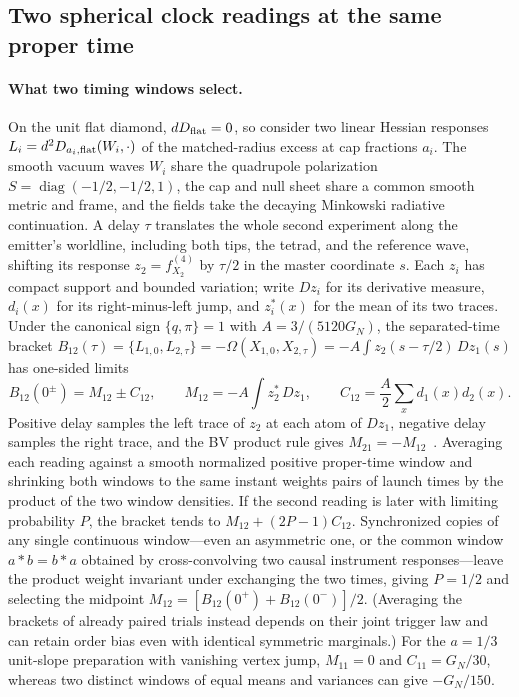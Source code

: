 \documentclass[10pt,a4paper]{article}
\numberwithin{equation}{section}
\begin{document}
\subsection{Two spherical clock readings at the same proper time}
\label{sec:timing}
\paragraph{What two timing windows select.}
On the unit flat diamond, $dD_{\rm flat}=0$, so consider two linear Hessian responses $L_i=d^2D_{a_i,\rm flat}(W_i,\cdot)$ of the matched-radius excess at cap fractions $a_i$. The smooth vacuum waves $W_i$ share the quadrupole polarization $S=\operatorname{diag}(-1/2,-1/2,1)$, the cap and null sheet share a common smooth metric and frame, and the fields take the decaying Minkowski radiative continuation. A delay $\tau$ translates the whole second experiment along the emitter's worldline, including both tips, the tetrad, and the reference wave, shifting its response $z_2=f_{X_2}^{(4)}$ by $\tau/2$ in the master coordinate $s$. Each $z_i$ has compact support and bounded variation; write $Dz_i$ for its derivative measure, $d_i(x)$ for its right-minus-left jump, and $z_i^*(x)$ for the mean of its two traces. Under the canonical sign $\{q,\pi\}=1$ with $A=3/(5120G_N)$, the separated-time bracket $B_{12}(\tau)=\{L_{1,0},L_{2,\tau}\}=-\Omega(X_{1,0},X_{2,\tau})=-A\int z_2(s-\tau/2)\,Dz_1(s)$ has one-sided limits
\begin{equation}
 B_{12}(0^\pm)= M_{12}\pm C_{12},\qquad
 M_{12}=-A\int z_2^*\,Dz_1,\qquad C_{12}=\frac A2\sum_x d_1(x)d_2(x).
 \label{eq:timing-bracket}
\end{equation}
Positive delay samples the left trace of $z_2$ at each atom of $Dz_1$, negative delay samples the right trace, and the BV product rule gives $M_{21}=-M_{12}$~\cite{Volpert1967}. Averaging each reading against a smooth normalized positive proper-time window and shrinking both windows to the same instant weights pairs of launch times by the product of the two window densities. If the second reading is later with limiting probability $P$, the bracket tends to $M_{12}+(2P-1)C_{12}$. Synchronized copies of any single continuous window---even an asymmetric one, or the common window $a*b=b*a$ obtained by cross-convolving two causal instrument responses---leave the product weight invariant under exchanging the two times, giving $P=1/2$ and selecting the midpoint $M_{12}=[B_{12}(0^+)+B_{12}(0^-)]/2$. (Averaging the brackets of already paired trials instead depends on their joint trigger law and can retain order bias even with identical symmetric marginals.) For the $a=1/3$ unit-slope preparation with vanishing vertex jump, $M_{11}=0$ and $C_{11}=G_N/30$, whereas two distinct windows of equal means and variances can give $-G_N/150$.
\end{document}
